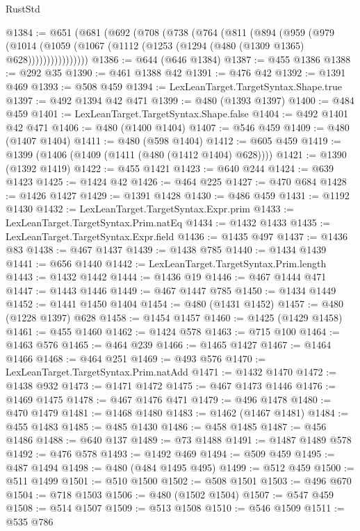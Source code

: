 \begin{lexlean}{RustStd}
\begin{coremodule}
@1384 := @651
    (@681
      (@692
        (@708
          (@738
            (@764
              (@811
                (@894
                  (@959
                    (@979
                      (@1014
                        (@1059 (@1067 (@1112 (@1253 (@1294 (@480 (@1309 @1365) @628))))))))))))))))
@1386 := @644 (@646 @1384)
@1387 := @455 @1386
@1388 := @292 @35
@1390 := @461 @1388 @42
@1391 := @476 @42
@1392 := @1391 @469
@1393 := @508 @459
@1394 := LexLeanTarget.TargetSyntax.Shape.true
@1397 := @492 @1394 @42 @471
@1399 := @480 (@1393 @1397)
@1400 := @484 @459
@1401 := LexLeanTarget.TargetSyntax.Shape.false
@1404 := @492 @1401 @42 @471
@1406 := @480 (@1400 @1404)
@1407 := @546 @459
@1409 := @480 (@1407 @1404)
@1411 := @480 (@598 @1404)
@1412 := @605 @459
@1419 := @1399 (@1406 (@1409 (@1411 (@480 (@1412 @1404) @628))))
@1421 := @1390 (@1392 @1419)
@1422 := @455 @1421
@1423 := @640 @244
@1424 := @639 @1423
@1425 := @1424 @42
@1426 := @464 @225
@1427 := @470 @684
@1428 := @1426 @1427
@1429 := @1391 @1428
@1430 := @486 @459
@1431 := @1192 @1430
@1432 := LexLeanTarget.TargetSyntax.Expr.prim
@1433 := LexLeanTarget.TargetSyntax.Prim.natEq
@1434 := @1432 @1433
@1435 := LexLeanTarget.TargetSyntax.Expr.field
@1436 := @1435 @497
@1437 := @1436 @83
@1438 := @467 @1437
@1439 := @1438 @785
@1440 := @1434 @1439
@1441 := @656 @1440
@1442 := LexLeanTarget.TargetSyntax.Prim.length
@1443 := @1432 @1442
@1444 := @1436 @19
@1446 := @467 @1444 @471
@1447 := @1443 @1446
@1449 := @467 @1447 @785
@1450 := @1434 @1449
@1452 := @1441 @1450 @1404
@1454 := @480 (@1431 @1452)
@1457 := @480 (@1228 @1397) @628
@1458 := @1454 @1457
@1460 := @1425 (@1429 @1458)
@1461 := @455 @1460
@1462 := @1424 @578
@1463 := @715 @100
@1464 := @1463 @576
@1465 := @464 @239
@1466 := @1465 @1427
@1467 := @1464 @1466
@1468 := @464 @251
@1469 := @493 @576
@1470 := LexLeanTarget.TargetSyntax.Prim.natAdd
@1471 := @1432 @1470
@1472 := @1438 @932
@1473 := @1471 @1472
@1475 := @467 @1473 @1446
@1476 := @1469 @1475
@1478 := @467 @1476 @471
@1479 := @496 @1478
@1480 := @470 @1479
@1481 := @1468 @1480
@1483 := @1462 (@1467 @1481)
@1484 := @455 @1483
@1485 := @485 @1430
@1486 := @458 @1485
@1487 := @456 @1486
@1488 := @640 @137
@1489 := @73 @1488
@1491 := @1487 @1489 @578
@1492 := @476 @578
@1493 := @1492 @469
@1494 := @509 @459
@1495 := @487 @1494
@1498 := @480 (@484 @1495 @495)
@1499 := @512 @459
@1500 := @511 @1499
@1501 := @510 @1500
@1502 := @508 @1501
@1503 := @496 @670
@1504 := @718 @1503
@1506 := @480 (@1502 @1504)
@1507 := @547 @459
@1508 := @514 @1507
@1509 := @513 @1508
@1510 := @546 @1509
@1511 := @535 @786

\end{coremodule}
\end{lexlean}
